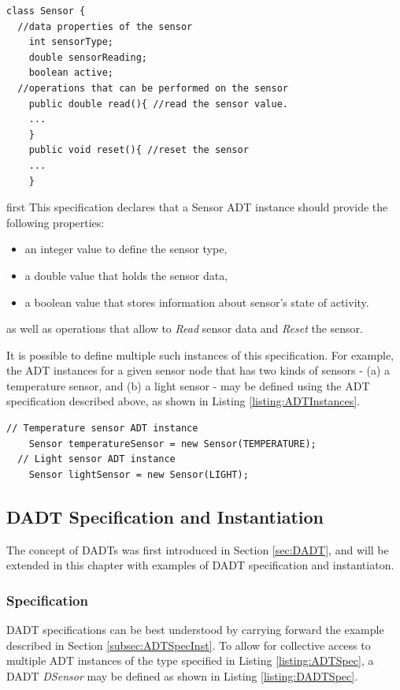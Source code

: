 \begin{lstlisting}[frame=trbl, basewidth={0.55em, 0.6em}, captionpos=b,
basicstyle=\ttfamily\footnotesize, breaklines, caption = Sensor ADT instances, label =
listing:ADTSpec]
class Sensor {
  //data properties of the sensor 
    int sensorType;
    double sensorReading;
    boolean active; 
  //operations that can be performed on the sensor  
    public double read(){ //read the sensor value.
    ...
    } 
    public void reset(){ //reset the sensor
    ...
    }    
\end{lstlisting}
first 
This specification declares that a Sensor ADT instance should provide the following properties:
\begin{itemize}
\item an integer value to define the sensor type,
\item a double value that holds the sensor data, 
\item a boolean value that stores information about sensor's state of activity.
\end{itemize}
as well as operations that allow to \emph{Read} sensor data and \emph{Reset}
the sensor.

It is possible to define multiple such instances of this specification. For
example, the ADT instances for a given sensor node that has two kinds of sensors
- (a) a temperature sensor, and (b) a light sensor - may be defined using the ADT
specification described above, as shown in Listing \ref{listing:ADTInstances}. 
\begin{lstlisting}[frame=trbl, basewidth={0.55em, 0.6em}, captionpos=b,
basicstyle=\ttfamily\footnotesize, breaklines, caption = Sensor ADT instances, label =
listing:ADTInstances]
  // Temperature sensor ADT instance
    Sensor temperatureSensor = new Sensor(TEMPERATURE);
  // Light sensor ADT instance  
    Sensor lightSensor = new Sensor(LIGHT);
\end{lstlisting}

\subsection{DADT Specification and Instantiation} \label{subsubsec:dadtspecandinst}

The concept of DADTs was first introduced in Section \ref{sec:DADT}, and will
be extended in this chapter with examples of DADT specification and
instantiaton.

\subsubsection{Specification}
DADT specifications can be best understood by carrying forward the example
described in Section \ref{subsec:ADTSpecInst}. To allow for collective access
to multiple ADT instances of the type specified in Listing
\ref{listing:ADTSpec}, a DADT \emph{DSensor} may be defined as shown in Listing
\ref{listing:DADTSpec}.   
 
